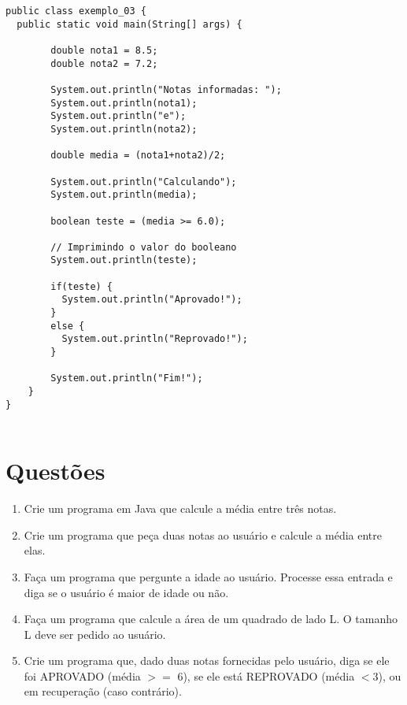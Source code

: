 \documentclass[12pt]{article}
\begin{document}
\begin{lstlisting}
public class exemplo_03 {
  public static void main(String[] args) {
        
        double nota1 = 8.5;
        double nota2 = 7.2;

        System.out.println("Notas informadas: ");
        System.out.println(nota1);
        System.out.println("e");
        System.out.println(nota2);         
               
        double media = (nota1+nota2)/2;

        System.out.println("Calculando");
        System.out.println(media);              
        
        boolean teste = (media >= 6.0);
        
        // Imprimindo o valor do booleano
        System.out.println(teste);
        
        if(teste) {
          System.out.println("Aprovado!");
        }
        else {
          System.out.println("Reprovado!");
        }
        
        System.out.println("Fim!");
    }
}


\end{lstlisting}



\section{Questões}

\begin{enumerate}
  \item Crie um programa em Java que calcule a média entre três notas.
  \item Crie um programa que peça duas notas ao usuário e calcule a média entre elas.
  \item Faça um programa que pergunte a idade ao usuário. Processe essa entrada e diga se o usuário é maior de idade ou não.
  \item Faça um programa que calcule a área de um quadrado de lado L. O tamanho L deve ser pedido ao usuário.
  \item Crie um programa que, dado duas notas fornecidas pelo usuário, diga se ele foi APROVADO (média $>=$ 6), se ele está REPROVADO (média $<3$), ou em recuperação (caso contrário).
\end{enumerate}




\end{document}

